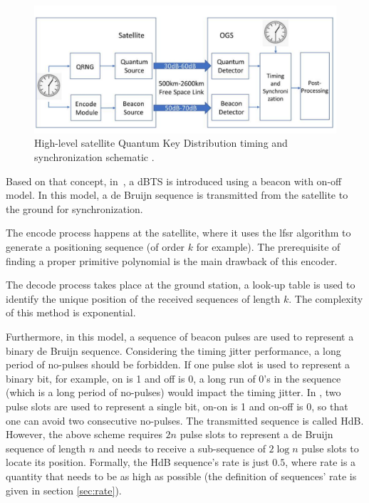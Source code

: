 \begin{figure}[htbp]
    \centering
    \includegraphics[scale=0.3]{fig/SatelliterQKD.png}
    \caption{High-level satellite Quantum Key Distribution timing and synchronization schematic \cite{zhang2021timing}.}
    \label{fig:qkd_satellite}
\end{figure}

Based on that concept, in~\cite{zhang2021timing}, a \gls{dBTS} is introduced using a beacon with on-off model. In this model, a de Bruijn sequence is transmitted from the satellite to the ground for synchronization. 

The encode process happens at the satellite, where it uses the \gls{lfsr} algorithm to generate a positioning sequence (of order $k$ for example). The prerequisite of finding a proper primitive polynomial is the main drawback of this encoder. 

The decode process takes place at the ground station, a look-up table is used to identify the unique position of the received sequences of length $k$. The complexity of this method is exponential.

Furthermore, in this model, a sequence of beacon pulses are used to represent a binary de Bruijn sequence. Considering the timing jitter performance, a long period of no-pulses should be forbidden. If one pulse slot is used to represent a binary bit, for example, on is 1 and off is 0, a long run of 0's in the sequence (which is a long period of no-pulses) would impact the timing jitter. In \cite{zhang2021timing}, two pulse slots are used to represent a single bit, on-on is 1 and on-off is 0, so that one can avoid two consecutive no-pulses. The transmitted sequence is called \gls{HdB}. However, the above scheme requires $2n$ pulse slots to represent a de Bruijn sequence of length $n$ and needs to receive a sub-sequence of $2 \log n$ pulse slots to locate its position. Formally, the \gls{HdB} sequence's rate is just $0.5$, where rate is a quantity that needs to be as high as possible (the definition of sequences' rate is given in section \ref{sec:rate}).

